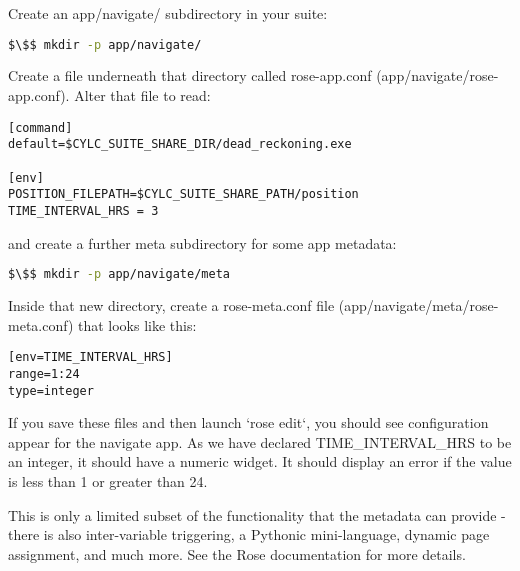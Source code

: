 Create an app/navigate/ subdirectory in your suite:

\begin{lstlisting}[mathescape, language=bash]
$\$$ mkdir -p app/navigate/
\end{lstlisting}

Create a file underneath that directory called rose-app.conf (app/navigate/rose-app.conf). Alter that file to read:

\lstset{language=suiterc}
\begin{lstlisting}[columns=fullflexible]
[command]
default=$CYLC_SUITE_SHARE_DIR/dead_reckoning.exe

[env]
POSITION_FILEPATH=$CYLC_SUITE_SHARE_PATH/position
TIME_INTERVAL_HRS = 3
\end{lstlisting}

and create a further meta subdirectory for some app metadata:

\begin{lstlisting}[mathescape, language=bash]
$\$$ mkdir -p app/navigate/meta
\end{lstlisting}

Inside that new directory, create a rose-meta.conf file (app/navigate/meta/rose-meta.conf) that looks like this:

\lstset{language=suiterc}
\begin{lstlisting}[columns=fullflexible]
[env=TIME_INTERVAL_HRS]
range=1:24
type=integer
\end{lstlisting}

If you save these files and then launch `rose edit`, you should see configuration appear for the navigate app. As we have declared TIME\_INTERVAL\_HRS to be an integer, it should have a numeric widget. It should display an error if the value is less than 1 or greater than 24.

This is only a limited subset of the functionality that the metadata can provide - there is also inter-variable triggering, a Pythonic mini-language, dynamic page assignment, and much more. See the Rose documentation for more details.
